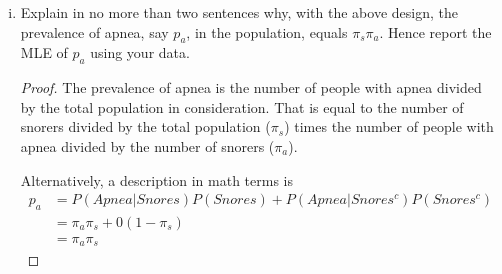 \documentclass[letterpaper, 12pt]{article}
\begin{document}
\begin{enumerate}[(i)]
\begin{proof}
\[\begin{bmatrix}
\frac{1}{\pi_s(1-\pi_s)}
&
0
\\
0
&
\frac{ \pi_s\pi_f}{\pi_a(1-\pi_a)}
\end{bmatrix}
\]
Thus,
\[
\sqrt{n}
\begin{bmatrix}
\hat{\pi}_a - \pi_s \\
\hat{\pi}_a - \pi_a
\end{bmatrix}
\xrightarrow{D}
N(0, I_1(\theta)^{-1})
=
N
\left(
\begin{bmatrix}
0\\0
\end{bmatrix}, 
\begin{bmatrix}
{\pi_s(1-\pi_s)}
&
0
\\
0
&
\frac{\pi_a(1-\pi_a)}{ \pi_s\pi_f}
\end{bmatrix}
\right)
\]
\end{proof}
\item
Explain in no more than two sentences why, with the above design, the prevalence of apnea, say $p_a$, in the population, equals $\pi_s \pi_a$. Hence report the MLE of $p_a$ using your data.
\begin{proof}
The prevalence of apnea is the number of people with apnea divided by the total population in consideration. That is equal to the number of snorers divided by the total population ($\pi_s$) times the number of people with apnea divided by the number of snorers ($\pi_a$).

Alternatively, a description in math terms is
\begin{align*}
p_a &= P(Apnea | Snores) P(Snores) + P(Apnea | Snores^c)P(Snores^c)
\\
&=
\pi_a \pi_s + 0(1-\pi_s)
\\
&=
\pi_a \pi_s
\end{align*}


\end{proof}
\end{enumerate}
\end{document}
